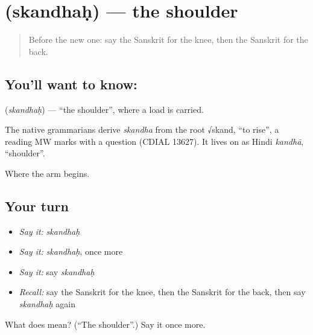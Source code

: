 \section[\texorpdfstring{\sk{स्कन्धः} (skandhaḥ)}{स्कन्धः (skandhaḥ)}]{ (skandhaḥ) — the shoulder}

\label{lesson:SA-C70-shoulder}



\begin{quote}
Before the new one: say the Sanskrit for the knee, then the Sanskrit for the back.
\end{quote}

\subsection*{You'll want to know: }
\textbf{} (\emph{skandhaḥ}) — \textquotedblleft{}the shoulder\textquotedblright{}, where a load is carried.

\begin{cousinweb}
The native grammarians derive \emph{skandha} from the root √skand, \textquotedblleft{}to rise\textquotedblright{}, a reading MW marks with a question (CDIAL 13627). It lives on as Hindi \emph{kandhā}, \textquotedblleft{}shoulder\textquotedblright{}.
\end{cousinweb}

\begin{grammarlens}[title={What you've built}]
Where the arm begins.
\end{grammarlens}

\subsection*{Your turn}
\begin{itemize}
\raggedright
  \item \emph{Say it:} \emph{skandhaḥ}
  \item \emph{Say it:} \emph{skandhaḥ}, once more
  \item \emph{Say it:} say \emph{skandhaḥ}
  \item \emph{Recall:} say the Sanskrit for the knee, then the Sanskrit for the back, then say \emph{skandhaḥ} again
\end{itemize}

\begin{tcolorbox}[breakable,colback=teal!4,colframe=teal!35!black,title={Before you move on}]
What does  mean? (\textquotedblleft{}The shoulder\textquotedblright{}.) Say it once more.
\end{tcolorbox}
